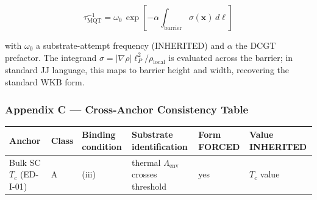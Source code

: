 \documentclass[
  11pt,
  a4paper,
]{article}
\newcounter{none} %
\begin{document}
\[
\tau_{\mathrm{MQT}}^{-1} = \omega_0\,\exp\!\left[-\alpha\!\int_{\mathrm{barrier}}\sigma(\mathbf{x})\,d\ell\right]
\]

with \(\omega_0\) a substrate-attempt frequency (INHERITED) and
\(\alpha\) the DCGT prefactor. The integrand
\(\sigma = |\nabla\rho|\ell_P^2/\rho_{\mathrm{local}}\) is evaluated
across the barrier; in standard JJ language, this maps to barrier height
and width, recovering the standard WKB form.

\subsubsection{Appendix C --- Cross-Anchor Consistency
Table}\label{appendix-c-cross-anchor-consistency-table}

{\def\LTcaptype{none} %
\begin{longtable}[]{@{}
  >{\raggedright\arraybackslash}p{}
  >{\raggedright\arraybackslash}p{}
  >{\raggedright\arraybackslash}p{}
  >{\raggedright\arraybackslash}p{}
  >{\raggedright\arraybackslash}p{}
  >{\raggedright\arraybackslash}p{}@{}}
\toprule\noalign{}
\begin{minipage}[b]{\linewidth}\raggedright
Anchor
\end{minipage} & \begin{minipage}[b]{\linewidth}\raggedright
Class
\end{minipage} & \begin{minipage}[b]{\linewidth}\raggedright
Binding condition
\end{minipage} & \begin{minipage}[b]{\linewidth}\raggedright
Substrate identification
\end{minipage} & \begin{minipage}[b]{\linewidth}\raggedright
Form FORCED
\end{minipage} & \begin{minipage}[b]{\linewidth}\raggedright
Value INHERITED
\end{minipage} \\
\midrule\noalign{}
\endhead
\bottomrule\noalign{}
\endlastfoot
Bulk SC \(T_c\) (ED-I-01) & A & (iii) & thermal
\(\Lambda_{\mathrm{env}}\) crosses threshold & yes & \(T_c\) value \\

\end{longtable}}
\end{document}
